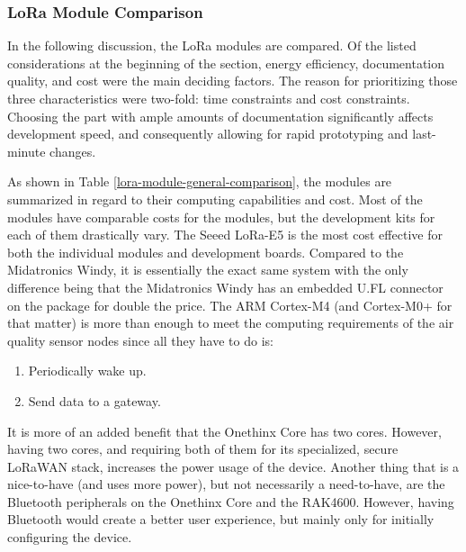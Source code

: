 \subsubsection{LoRa Module Comparison}
In the following discussion, the LoRa modules are compared. Of the listed
considerations at the beginning of the section, energy efficiency, documentation
quality, and cost were the main deciding factors. The reason for prioritizing
those three characteristics were two-fold: time constraints and cost
constraints. Choosing the part with ample amounts of documentation significantly
affects development speed, and consequently allowing for rapid prototyping and
last-minute changes.

As shown in Table \ref{lora-module-general-comparison}, the modules are summarized in regard to their
computing capabilities and cost. Most of the modules have comparable costs for
the modules, but the development kits for each of them drastically vary. The
Seeed LoRa-E5 is the most cost effective for both the individual modules and
development boards. Compared to the Midatronics Windy, it is essentially the
exact same system with the only difference being that the Midatronics Windy has
an embedded U.FL connector on the package for double the price. The ARM
Cortex-M4 (and Cortex-M0+ for that matter) is more than enough to meet the
computing requirements of the air quality sensor nodes since all they have to do
is:

\begin{enumerate}
    \item Periodically wake up.
    \item Send data to a gateway.
\end{enumerate}

It is more of an added
benefit that the Onethinx Core has two cores. However, having two cores, and
requiring both of them for its specialized, secure LoRaWAN stack, increases the
power usage of the device. Another thing that is a nice-to-have (and uses more
power), but not necessarily a need-to-have, are the Bluetooth peripherals on the
Onethinx Core and the RAK4600. However, having Bluetooth would create a better
user experience, but mainly only for initially configuring the device.

